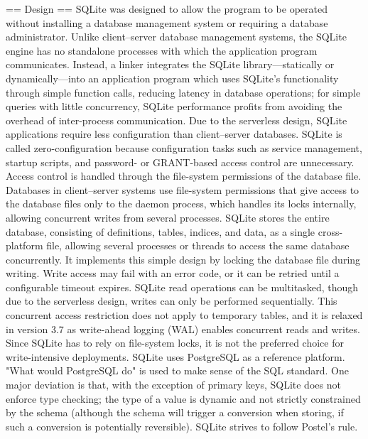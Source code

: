 == Design ==
SQLite was designed to allow the program to be operated without installing a database management system or requiring a database administrator. Unlike client–server database management systems, the SQLite engine has no standalone processes with which the application program communicates. Instead, a linker integrates the SQLite library—statically or dynamically—into an application program which uses SQLite's functionality through simple function calls, reducing latency in database operations; for simple queries with little concurrency, SQLite performance profits from avoiding the overhead of inter-process communication.
Due to the serverless design, SQLite applications require less configuration than client–server databases. SQLite is called zero-configuration because configuration tasks such as service management, startup scripts, and password- or GRANT-based access control are unnecessary. Access control is handled through the file-system permissions of the database file. Databases in client–server systems use file-system permissions that give access to the database files only to the daemon process, which handles its locks internally, allowing concurrent writes from several processes.
SQLite stores the entire database, consisting of definitions, tables, indices, and data, as a single cross-platform file, allowing several processes or threads to access the same database concurrently. It implements this simple design by locking the database file during writing. Write access may fail with an error code, or it can be retried until a configurable timeout expires. SQLite read operations can be multitasked, though due to the serverless design, writes can only be performed sequentially. This concurrent access restriction does not apply to temporary tables, and it is relaxed in version 3.7 as write-ahead logging (WAL) enables concurrent reads and writes. Since SQLite has to rely on file-system locks, it is not the preferred choice for write-intensive deployments.
SQLite uses PostgreSQL as a reference platform. "What would PostgreSQL do" is used to make sense of the SQL standard. One major deviation is that, with the exception of primary keys, SQLite does not enforce type checking; the type of a value is dynamic and not strictly constrained by the schema (although the schema will trigger a conversion when storing, if such a conversion is potentially reversible). SQLite strives to follow Postel's rule.


